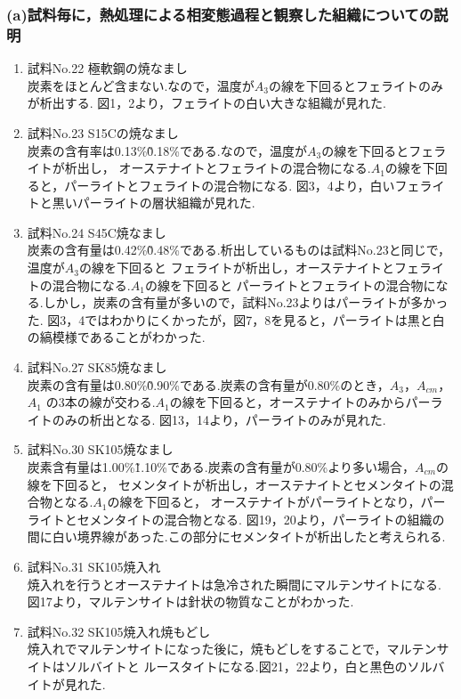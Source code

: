 \documentclass[10pt，a4j]{jsarticle}
\begin{document}
    \subsubsection{(a)試料毎に，熱処理による相変態過程と観察した組織についての説明}
      \begin{enumerate}
        \item 試料No.22 極軟鋼の焼なまし \\
          炭素をほとんど含まない.なので，温度が$A_{3}$の線を下回るとフェライトのみが析出する.
          図1，2より，フェライトの白い大きな組織が見れた.
        \item 試料No.23 S15Cの焼なまし \\
          炭素の含有率は0.13\%\~0.18\%である.なので，温度が$A_{3}$の線を下回るとフェライトが析出し，
          オーステナイトとフェライトの混合物になる.$A_{1}$の線を下回ると，パーライトとフェライトの混合物になる.
          図3，4より，白いフェライトと黒いパーライトの層状組織が見れた.
        \item 試料No.24 S45C焼なまし \\
          炭素の含有量は0.42\%\~0.48\%である.析出しているものは試料No.23と同じで，温度が$A_{3}$の線を下回ると
          フェライトが析出し，オーステナイトとフェライトの混合物になる.$A_{1}$の線を下回ると
          パーライトとフェライトの混合物になる.しかし，炭素の含有量が多いので，試料No.23よりはパーライトが多かった.
          図3，4ではわかりにくかったが，図7，8を見ると，パーライトは黒と白の縞模様であることがわかった.
        \item 試料No.27 SK85焼なまし \\
          炭素の含有量は0.80\%\~0.90\%である.炭素の含有量が0.80\%のとき，$A_{3}$，$A_{cm}$，$A_{1}$
          の3本の線が交わる.$A_{1}$の線を下回ると，オーステナイトのみからパーライトのみの析出となる.
          図13，14より，パーライトのみが見れた.
        \item 試料No.30 SK105焼なまし \\
          炭素含有量は1.00\%\~1.10\%である.炭素の含有量が0.80\%より多い場合，$A_{cm}$の線を下回ると，
          セメンタイトが析出し，オーステナイトとセメンタイトの混合物となる.$A_{1}$の線を下回ると，
          オーステナイトがパーライトとなり，パーライトとセメンタイトの混合物となる.
          図19，20より，パーライトの組織の間に白い境界線があった.この部分にセメンタイトが析出したと考えられる.  
        \item 試料No.31 SK105焼入れ \\
          焼入れを行うとオーステナイトは急冷された瞬間にマルテンサイトになる.
          図17より，マルテンサイトは針状の物質なことがわかった.
        \item 試料No.32 SK105焼入れ焼もどし \\
          焼入れでマルテンサイトになった後に，焼もどしをすることで，マルテンサイトはソルバイトと
          ルースタイトになる.図21，22より，白と黒色のソルバイトが見れた.
      \end{enumerate}
\end{document}

